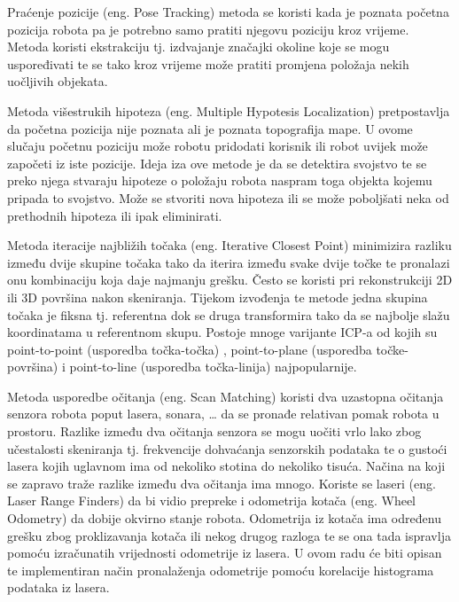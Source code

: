 Praćenje pozicije (eng. Pose Tracking) metoda se koristi kada je poznata početna pozicija robota pa je potrebno samo pratiti njegovu poziciju kroz vrijeme. Metoda koristi ekstrakciju tj. izdvajanje značajki okoline koje se mogu uspoređivati te se tako kroz vrijeme može pratiti promjena položaja nekih uočljivih objekata.

Metoda višestrukih hipoteza (eng. Multiple Hypotesis Localization) pretpostavlja da početna pozicija nije poznata ali je poznata topografija mape. U ovome slučaju početnu poziciju može robotu pridodati korisnik ili robot uvijek može započeti iz iste pozicije. Ideja iza ove metode je da se detektira svojstvo te se preko njega stvaraju hipoteze o položaju robota naspram toga objekta kojemu pripada to svojstvo. Može se stvoriti nova hipoteza ili se može poboljšati neka od prethodnih hipoteza ili ipak eliminirati.

Metoda iteracije najbližih točaka (eng. Iterative Closest Point) minimizira razliku između dvije skupine točaka tako da iterira između svake dvije točke te pronalazi onu kombinaciju koja daje najmanju grešku. Često se koristi pri rekonstrukciji 2D ili 3D površina nakon skeniranja. Tijekom izvođenja te metode jedna skupina točaka je fiksna tj. referentna dok se druga transformira tako da se najbolje slažu koordinatama u referentnom skupu. Postoje mnoge varijante ICP-a od kojih su point-to-point (usporedba točka-točka) , point-to-plane (usporedba točke-površina) i point-to-line (usporedba točka-linija) najpopularnije.

Metoda usporedbe očitanja (eng. Scan Matching) koristi dva uzastopna očitanja senzora robota poput lasera, sonara, … da se pronađe relativan pomak robota u prostoru. Razlike između dva očitanja senzora se mogu uočiti vrlo lako zbog učestalosti skeniranja tj. frekvencije dohvaćanja senzorskih podataka te o gustoći lasera kojih uglavnom ima od nekoliko stotina do nekoliko tisuća. Načina na koji se zapravo traže razlike između dva očitanja ima mnogo. Koriste se laseri (eng. Laser Range Finders) da bi vidio prepreke i odometrija kotača (eng. Wheel Odometry) da dobije okvirno stanje robota. Odometrija iz kotača ima određenu grešku zbog proklizavanja kotača ili nekog drugog razloga te se ona tada ispravlja pomoću izračunatih vrijednosti odometrije iz lasera. U ovom radu će biti opisan te implementiran način pronalaženja odometrije pomoću korelacije histograma podataka iz lasera.

